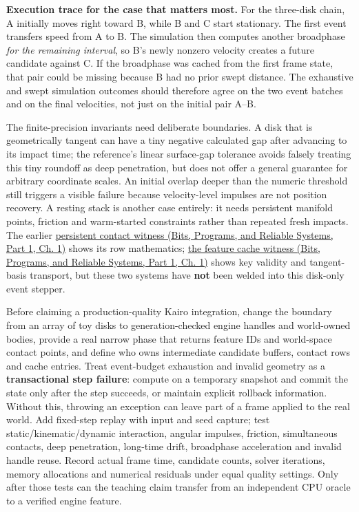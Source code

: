 \textbf{Execution trace for the case that matters most.} For the three-disk chain, A initially moves right toward B, while B and C start stationary. The first event transfers speed from A to B. The simulation then computes another broadphase \emph{for the remaining interval}, so B's newly nonzero velocity creates a future candidate against C. If the broadphase was cached from the first frame state, that pair could be missing because B had no prior swept distance. The exhaustive and swept simulation outcomes should therefore agree on the two event batches and on the final velocities, not just on the initial pair A--B.

The finite-precision invariants need deliberate boundaries. A disk that is geometrically tangent can have a tiny negative calculated gap after advancing to its impact time; the reference's linear surface-gap tolerance avoids falsely treating this tiny roundoff as deep penetration, but does not offer a general guarantee for arbitrary coordinate scales. An initial overlap deeper than the numeric threshold still triggers a visible failure because velocity-level impulses are not position recovery. A resting stack is another case entirely: it needs persistent manifold points, friction and warm-started constraints rather than repeated fresh impacts. The earlier \href{../01-Bits-Programs-and-Reliable-Systems-P01/main.pdf\#nameddest=source-file-44c320ffad9698c7abd453e2}{persistent contact witness (Bits, Programs, and Reliable Systems, Part 1, Ch. 1)} shows its row mathematics; \href{../01-Bits-Programs-and-Reliable-Systems-P01/main.pdf\#nameddest=source-file-830b13449e1c6505af693753}{the feature cache witness (Bits, Programs, and Reliable Systems, Part 1, Ch. 1)} shows key validity and tangent-basis transport, but these two systems have \textbf{not} been welded into this disk-only event stepper.

Before claiming a production-quality Kairo integration, change the boundary from an array of toy disks to generation-checked engine handles and world-owned bodies, provide a real narrow phase that returns feature IDs and world-space contact points, and define who owns intermediate candidate buffers, contact rows and cache entries. Treat event-budget exhaustion and invalid geometry as a \textbf{transactional step failure}: compute on a temporary snapshot and commit the state only after the step succeeds, or maintain explicit rollback information. Without this, throwing an exception can leave part of a frame applied to the real world. Add fixed-step replay with input and seed capture; test static/kinematic/dynamic interaction, angular impulses, friction, simultaneous contacts, deep penetration, long-time drift, broadphase acceleration and invalid handle reuse. Record actual frame time, candidate counts, solver iterations, memory allocations and numerical residuals under equal quality settings. Only after those tests can the teaching claim transfer from an independent CPU oracle to a verified engine feature.

